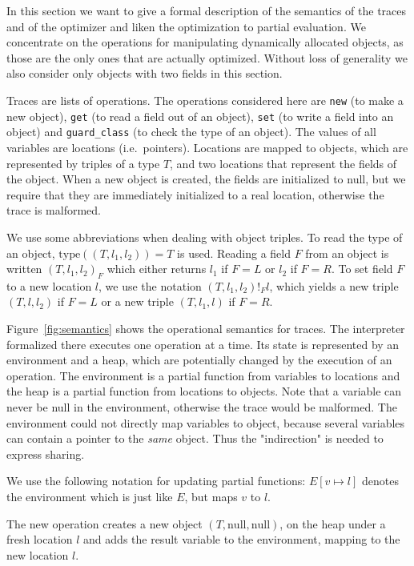 \documentclass{sigplanconf}
\begin{document}
In this section we want to give a formal description of the semantics of the
traces and of the optimizer and liken the optimization to partial evaluation.
We concentrate on the operations for manipulating dynamically allocated objects,
as those are the only ones that are actually optimized. Without loss of
generality we also consider only objects with two fields in this section.

Traces are lists of operations. The operations considered here are \texttt{new} (to make
a new object), \texttt{get} (to read a field out of an object), \texttt{set} (to write a field
into an object) and \texttt{guard\_class} (to check the type of an object). The values of all
variables are locations (i.e.~pointers). Locations are mapped to objects, which
are represented by triples of a type $T$, and two locations that represent the
fields of the object. When a new object is created, the fields are initialized
to null, but we require that they are immediately initialized to a real
location, otherwise the trace is malformed.

We use some abbreviations when dealing with object triples. To read the type of
an object, $\mathrm{type}((T,l_1,l_2))=T$ is used. Reading a field $F$ from an
object is written $(T,l_1,l_2)_F$ which either returns $l_1$ if $F=L$ or $l_2$
if $F=R$. To set field $F$ to a new location $l$, we use the notation
$(T,l_1,l_2)!_Fl$, which yields a new triple $(T,l,l_2)$ if $F=L$ or a new
triple $(T,l_1,l)$ if $F=R$.

Figure~\ref{fig:semantics} shows the operational semantics for traces. The
interpreter formalized there executes one operation at a time. Its state is
represented by an environment and a heap, which are potentially changed by the
execution of an operation. The environment is a partial function from variables
to locations and the heap is a partial function from locations to objects. Note
that a variable can never be null in the environment, otherwise the trace would
be malformed. The environment could not directly map variables to object,
because several variables can contain a pointer to the \emph{same} object. Thus
the "indirection" is needed to express sharing.

We use the following notation for updating partial functions:
$E[v\mapsto l]$ denotes the environment which is just like $E$, but maps $v$ to
$l$.

The new operation creates a new object $(T,\mathrm{null},\mathrm{null})$, on the
heap under a fresh location $l$ and adds the result variable to the environment,
mapping to the new location $l$.
\end{document}
